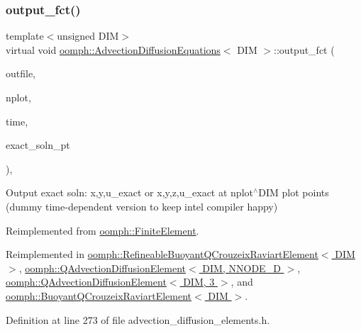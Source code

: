 \subsubsection{\texorpdfstring{output\+\_\+fct()}{output\_fct()}\hspace{0.1cm}{\footnotesize\ttfamily [2/2]}}
{\footnotesize\ttfamily template$<$unsigned D\+IM$>$ \\
virtual void \hyperlink{classoomph_1_1AdvectionDiffusionEquations}{oomph\+::\+Advection\+Diffusion\+Equations}$<$ D\+IM $>$\+::output\+\_\+fct (\begin{DoxyParamCaption}\item[{std\+::ostream \&}]{outfile,  }\item[{const unsigned \&}]{nplot,  }\item[{const double \&}]{time,  }\item[{\hyperlink{classoomph_1_1FiniteElement_ad4ecf2b61b158a4b4d351a60d23c633e}{Finite\+Element\+::\+Unsteady\+Exact\+Solution\+Fct\+Pt}}]{exact\+\_\+soln\+\_\+pt }\end{DoxyParamCaption})\hspace{0.3cm}{\ttfamily [inline]}, {\ttfamily [virtual]}}



Output exact soln\+: x,y,u\+\_\+exact or x,y,z,u\+\_\+exact at nplot$^\wedge$\+D\+IM plot points (dummy time-\/dependent version to keep intel compiler happy) 



Reimplemented from \hyperlink{classoomph_1_1FiniteElement_a2a8426dccd57b927be0ae0eec00d0479}{oomph\+::\+Finite\+Element}.



Reimplemented in \hyperlink{classoomph_1_1RefineableBuoyantQCrouzeixRaviartElement_aa1eaab23a14039a18701b5666629b5bc}{oomph\+::\+Refineable\+Buoyant\+Q\+Crouzeix\+Raviart\+Element$<$ D\+I\+M $>$}, \hyperlink{classoomph_1_1QAdvectionDiffusionElement_a0e5d05a939eebc797ec8d6b400296bfd}{oomph\+::\+Q\+Advection\+Diffusion\+Element$<$ D\+I\+M, N\+N\+O\+D\+E\+\_\+D $>$}, \hyperlink{classoomph_1_1QAdvectionDiffusionElement_a0e5d05a939eebc797ec8d6b400296bfd}{oomph\+::\+Q\+Advection\+Diffusion\+Element$<$ D\+I\+M, 3 $>$}, and \hyperlink{classoomph_1_1BuoyantQCrouzeixRaviartElement_ae1c6dc6850532af9ec618415ba31e053}{oomph\+::\+Buoyant\+Q\+Crouzeix\+Raviart\+Element$<$ D\+I\+M $>$}.



Definition at line 273 of file advection\+\_\+diffusion\+\_\+elements.\+h.



